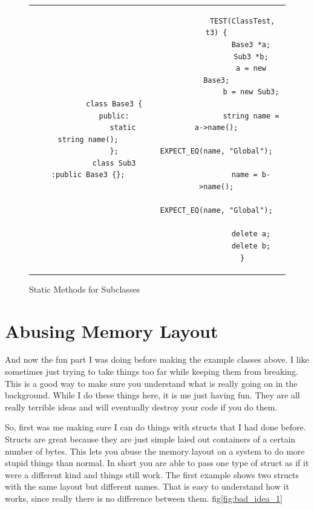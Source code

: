 \documentclass[12pt]{article}
\begin{document}
\begin{figure}[!ht]
	\centering
	\begin{tabular}{c c}
		\begin{minipage}[t]{0.45\textwidth}
		\begin{verbatim}
			class Base3 {
			public:
				static string name();
			};
			class Sub3 :public Base3 {};
		\end{verbatim}
		\end{minipage}
		&
		\begin{minipage}[t]{0.5\textwidth}
		\begin{verbatim}
			TEST(ClassTest, t3) {
				Base3 *a;
				Sub3 *b;
				a = new Base3;
				b = new Sub3;

				string name = a->name();
				EXPECT_EQ(name, "Global");

				name = b->name();
				EXPECT_EQ(name, "Global");

				delete a;
				delete b;
			}
		\end{verbatim}
		\end{minipage}
		\\
	\end{tabular}
	\caption{Static Methods for Subclasses}
	\label{fig:class_ex3}
\end{figure}

\newpage
\section{Abusing Memory Layout}
And now the fun part I was doing before making the example classes above.
I like sometimes just trying to take things too far while keeping them from breaking.
This is a good way to make sure you understand what is really going on in the background.
While I do these things here, it is me just having fun.
They are all really terrible ideas and will eventually destroy your code if you do them.

So, first was me making sure I can do things with structs that I had done before.
Structs are great because they are just simple laied out containers of a certain number of bytes.
This lets you abuse the memory layout on a system to do more stupid things than normal.
In short you are able to pass one type of struct as if it were a different kind and things still work. 
The first example shows two structs with the same layout but different names.
That is easy to understand how it works, since really there is no difference between them.
fig\ref{fig:bad_idea_1}
\end{document}
